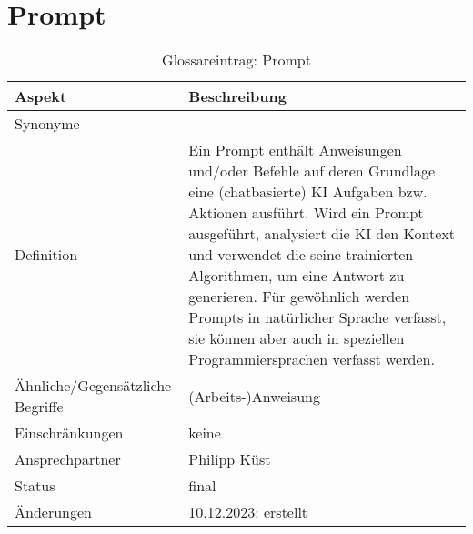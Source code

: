 \section*{Prompt}\label{sec:glossar_prompt}
\begin{table}[H]
    \label{tab:glossar_prompt}
    \begin{tabularx}{\textwidth}{|l|X|}
        \hline
        \textbf{Aspekt}                  & \textbf{Beschreibung} \\
        \hline
        Synonyme                         & -                     \\
        \hline
        Definition & Ein Prompt enthält Anweisungen und/oder Befehle auf deren Grundlage eine (chatbasierte) KI Aufgaben bzw. Aktionen ausführt.
        Wird ein Prompt ausgeführt, analysiert die KI den Kontext und verwendet die seine trainierten Algorithmen, um eine Antwort zu generieren.
        Für gewöhnlich werden Prompts in natürlicher Sprache verfasst, sie können aber auch in speziellen Programmiersprachen verfasst werden. \\
        \hline
        Ähnliche/Gegensätzliche Begriffe & (Arbeits-)Anweisung   \\
        \hline
        Einschränkungen                  & keine                 \\
        \hline
        Ansprechpartner                  & Philipp Küst          \\
        \hline
        Status                           & final                 \\
        \hline
        Änderungen                       & 10.12.2023: erstellt  \\
        \hline
    \end{tabularx}
    \caption{Glossareintrag: Prompt}
\end{table}



